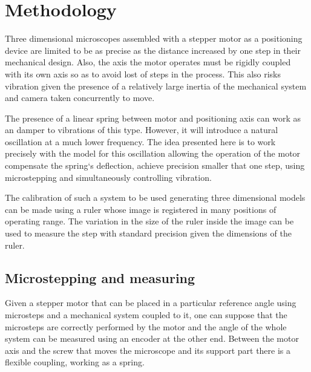 \documentclass[journal]{IEEEtran}
\begin{document}

\section{Methodology}

Three dimensional microscopes assembled with a stepper motor as a positioning device are limited to be as precise as the distance increased by one step in their mechanical design. Also, the axis the motor operates must be rigidly coupled with its own axis so as to avoid lost of steps in the process. This also risks vibration given the presence of a relatively large inertia of the mechanical system and camera taken concurrently to move.

The presence of a linear spring between motor and positioning axis can work as an damper to vibrations of this type. However, it will introduce a natural oscillation at a much lower frequency. The idea presented here is to work precisely with the model for this oscillation allowing the operation of the motor compensate the spring`s deflection, achieve precision smaller that one step, using microstepping and simultaneously controlling vibration.

The calibration of such a system to be used generating three dimensional models can be made using a ruler whose image is registered in many positions of operating range. The variation in the size of the ruler inside the image can be used to measure the step with standard precision given the dimensions of the ruler.

\subsection{Microstepping and measuring}

Given a stepper motor that can be placed in a particular reference angle using microsteps and a mechanical system coupled to it, one can suppose that the microsteps are correctly performed by the motor and the angle of the whole system can be measured using an encoder at the other end. Between the motor axis and the screw that moves the microscope and its support part there is a flexible coupling, working as a spring.
\end{document}
